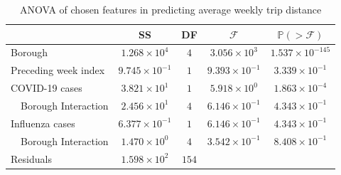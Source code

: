\documentclass[11pt]{article}
\begin{document}
\begin{table}[H]
    \centering
    \caption{ANOVA of chosen features in predicting average weekly trip distance}
    \label{tbl:anova1}
    \begin{tabular}{llcccc}
    \hline
                  &                                     & SS          & DF    & $\mathcal{F}$ & $\mathbb{P}(>\mathcal{F})$ \\ \hline
    \multicolumn{2}{l}{Borough}                         & $1.268 \times 10^{4}$ & $4  $ & $3.056 \times 10^{3}$   & $1.537 \times 10^{-145}$          \\ \hline
    \multicolumn{2}{l}{Preceding week index}            & $9.745 \times 10^{-1}$ & $1  $ & $9.393 \times 10^{-1}$   & $3.339 \times 10^{-1  }$          \\ \hline
    \multicolumn{2}{l}{COVID-19 cases}                  & $3.821 \times 10^{1}$ & $1  $ & $5.918 \times 10^{0}$   & $1.863 \times 10^{-4  }$          \\ \hline
                  & Borough Interaction                 & $2.456 \times 10^{1}$ & $4  $ & $6.146 \times 10^{-1}$   & $4.343 \times 10^{-1  }$          \\ \hline
    \multicolumn{2}{l}{Influenza cases}                 & $6.377 \times 10^{-1}$ & $1  $ & $6.146 \times 10^{-1}$   & $4.343 \times 10^{-1  }$          \\ \hline
                  & Borough Interaction                 & $1.470 \times 10^{0}$ & $4  $ & $3.542 \times 10^{-1}$   & $8.408 \times 10^{-1  }$          \\ \hline
    \multicolumn{2}{l}{Residuals}                       & $1.598 \times 10^{2}$ & $154$ &           &                     \\ \hline
    \end{tabular}
\end{table}
\end{document}

